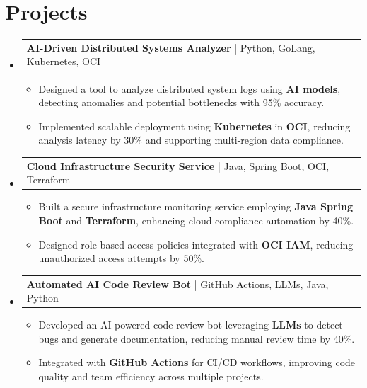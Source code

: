 \documentclass[letterpaper,11pt]{article}
\makeatletter
\newcommand{\resumeItem}[1]{
  \item\footnotesize{
    {#1 \vspace{-2pt}}
  }
}
\newcommand{\resumeProjectHeading}[2]{
    \item
    \begin{tabular*}{1.001\textwidth}{l@{\extracolsep{\fill}}r}
      \small#1 & \textbf{\small #2}\\
    \end{tabular*}\vspace{-7pt}
}
\newcommand{\resumeSubHeadingListStart}{\begin{itemize}[leftmargin=0pt, label={}]}
\newcommand{\resumeSubHeadingListEnd}{\end{itemize}}
\newcommand{\resumeItemListStart}{\begin{itemize}[leftmargin=*]}
\newcommand{\resumeItemListEnd}{\end{itemize}\vspace{-5pt}}
\makeatother
\begin{document}
\section{Projects}
    \vspace{-5pt}
    \resumeSubHeadingListStart
      \resumeProjectHeading
          {\textbf{AI-Driven Distributed Systems Analyzer} | Python, GoLang, Kubernetes, OCI}{}
          \resumeItemListStart
              \resumeItem{Designed a tool to analyze distributed system logs using \textbf{AI models}, detecting anomalies and potential bottlenecks with 95\% accuracy.}
              \resumeItem{Implemented scalable deployment using \textbf{Kubernetes} in \textbf{OCI}, reducing analysis latency by 30\% and supporting multi-region data compliance.}
          \resumeItemListEnd
          \vspace{-12pt}
      \resumeProjectHeading
          {\textbf{Cloud Infrastructure Security Service} | Java, Spring Boot, OCI, Terraform}{}
          \resumeItemListStart
              \resumeItem{Built a secure infrastructure monitoring service employing \textbf{Java Spring Boot} and \textbf{Terraform}, enhancing cloud compliance automation by 40\%.}
              \resumeItem{Designed role-based access policies integrated with \textbf{OCI IAM}, reducing unauthorized access attempts by 50\%.}
          \resumeItemListEnd
          \vspace{-12pt}
      \resumeProjectHeading
          {\textbf{Automated AI Code Review Bot} | GitHub Actions, LLMs, Java, Python}{}
          \resumeItemListStart
              \resumeItem{Developed an AI-powered code review bot leveraging \textbf{LLMs} to detect bugs and generate documentation, reducing manual review time by 40\%.}
              \resumeItem{Integrated with \textbf{GitHub Actions} for CI/CD workflows, improving code quality and team efficiency across multiple projects.}
          \resumeItemListEnd 
    \resumeSubHeadingListEnd
\end{document}
